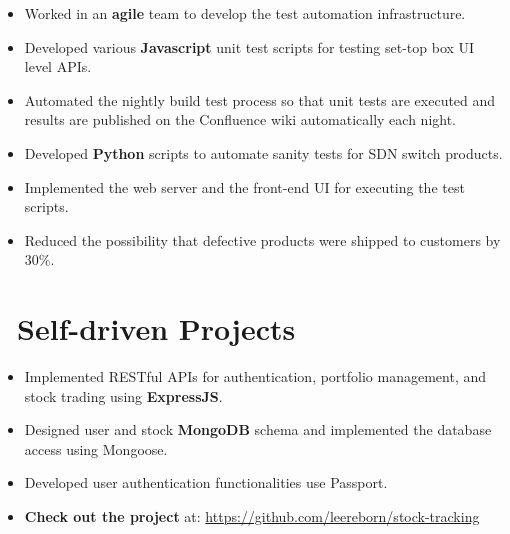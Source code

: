 \documentclass{resume}
\begin{document}
\begin{itemize}
	\item Worked in an \textbf{agile} team to develop the test automation infrastructure.
	\item Developed various \textbf{Javascript} unit test scripts for testing set-top box UI level APIs.
	\item Automated the nightly build test process so that unit tests are executed and results are published on the Confluence wiki automatically each night.
\end{itemize}

\begin{itemize}
	\item Developed \textbf{Python} scripts to automate sanity tests for SDN switch products.
	\item Implemented the web server and the front-end UI for executing the test scripts. 
	\item Reduced the possibility that defective products were shipped to customers by 30\%.
\end{itemize}

\section{\faUsers\ Self-driven Projects}
\begin{itemize}
	\item Implemented RESTful APIs for authentication, portfolio management, and stock trading using \textbf{ExpressJS}.
	\item Designed user and stock \textbf{MongoDB} schema and implemented the database access using Mongoose.
	\item Developed user authentication functionalities use Passport.
	\item \textbf{Check out the project} at: \url{https://github.com/leereborn/stock-tracking}
\end{itemize}
\end{document}
